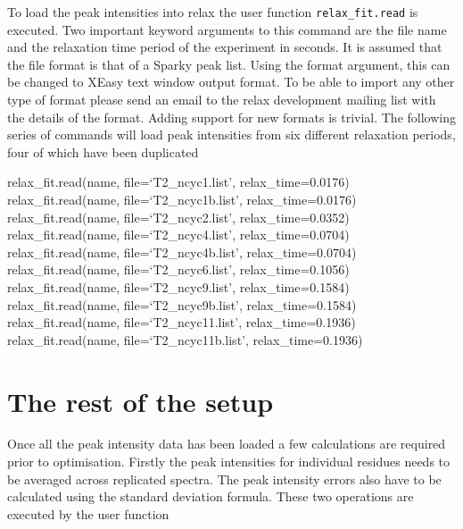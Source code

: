 
To load the peak intensities into relax the user function \texttt{relax\_fit.read} is executed.  Two important keyword arguments to this command are the file name and the relaxation time period of the experiment in seconds.  It is assumed that the file format is that of a Sparky peak list.  Using the format argument, this can be changed to XEasy text window output format.  To be able to import any other type of format please send an email to the relax development mailing list with the details of the format.  Adding support for new formats is trivial.  The following series of commands will load peak intensities from six different relaxation periods, four of which have been duplicated

\begin{exampleenv}
relax\_fit.read(name, file=`T2\_ncyc1.list', relax\_time=0.0176) \\
relax\_fit.read(name, file=`T2\_ncyc1b.list', relax\_time=0.0176) \\
relax\_fit.read(name, file=`T2\_ncyc2.list', relax\_time=0.0352) \\
relax\_fit.read(name, file=`T2\_ncyc4.list', relax\_time=0.0704) \\
relax\_fit.read(name, file=`T2\_ncyc4b.list', relax\_time=0.0704) \\
relax\_fit.read(name, file=`T2\_ncyc6.list', relax\_time=0.1056) \\
relax\_fit.read(name, file=`T2\_ncyc9.list', relax\_time=0.1584) \\
relax\_fit.read(name, file=`T2\_ncyc9b.list', relax\_time=0.1584) \\
relax\_fit.read(name, file=`T2\_ncyc11.list', relax\_time=0.1936) \\
relax\_fit.read(name, file=`T2\_ncyc11b.list', relax\_time=0.1936)
\end{exampleenv}




\section{The rest of the setup}

Once all the peak intensity data has been loaded a few calculations are required prior to optimisation.  Firstly the peak intensities for individual residues needs to be averaged across replicated spectra.  The peak intensity errors also have to be calculated using the standard deviation formula.  These two operations are executed by the user function

